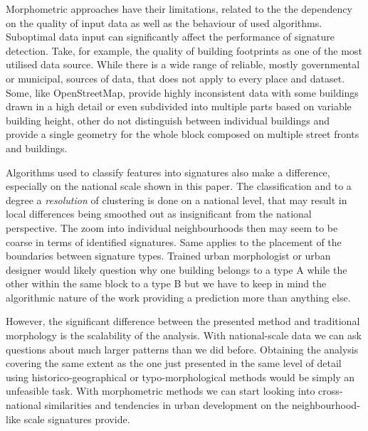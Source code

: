 Morphometric approaches have their limitations, related to the the dependency on the
quality of input data as well as the behaviour of used algorithms. Suboptimal data
input can significantly affect the performance of signature detection. Take, for example,
the quality of building footprints as one of the most utilised data source. While there
is a wide range of reliable, mostly governmental or municipal, sources of data, that
does not apply to every place and dataset. Some, like OpenStreetMap, provide highly
inconsistent data with some buildings drawn in a high detail or even subdivided into
multiple parts based on variable building height, other do not distinguish between
individual buildings and provide a single geometry for the whole block composed on
multiple street fronts and buildings.

Algorithms used to classify features into signatures also make a difference, especially
on the national scale shown in this paper. The classification and to a degree a
\textit{resolution} of clustering is done on a national level, that may result in local
differences being smoothed out as insignificant from the national perspective. The zoom
into individual neighbourhoods then may seem to be coarse in terms of identified
signatures. Same applies to the placement of the boundaries between signature types.
Trained urban morphologist or urban designer would likely question why one building
belongs to a type A while the other within the same block to a type B but we have to
keep in mind the algorithmic nature of the work providing a prediction more than
anything else.

However, the significant difference between the presented method and traditional
morphology is the scalability of the analysis. With national-scale data we can ask
questions about much larger patterns than we did before. Obtaining the analysis covering
the same extent as the one just presented in the same level of detail using
historico-geographical or typo-morphological methods would be simply an unfeasible task.
With morphometric methods we can start looking into cross-national similarities and
tendencies in urban development on the neighbourhood-like scale signatures provide.